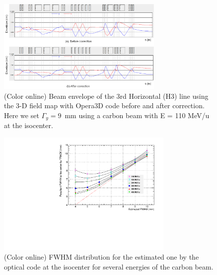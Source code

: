 \documentclass[jkps,preprint,fleqn,showpacs,showkeys,10pt,twocolumn]{revtex4}
\begin{document}
\begin{figure}[h]
  \begin{center}
    \includegraphics[width=8.0cm]{Fig06.png}    
    \caption{(Color online) Beam envelope of the 3rd Horizontal (H3) line using the 3-D field map with Opera3D code before and after correction.
      Here we set $\Gamma_{y} = 9$~mm using a carbon beam with E = 110 MeV/u at the isocenter.}
    \label{fig5}
  \end{center}
\end{figure}
\begin{figure}[h]
  \begin{center}
    \includegraphics[width=8.5cm]{Fig06-1.pdf}    
    \caption{(Color online) FWHM distribution for the estimated one by the optical code at the isocenter
      for several energies of the carbon beam.}
    \label{fig6}
  \end{center}
\end{figure}
\end{document}
